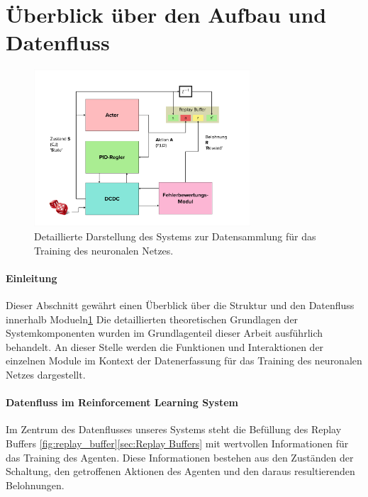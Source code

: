 \section{Überblick über den Aufbau und Datenfluss}

\begin{figure}[htbp]
\centering
\includegraphics[width=0.72\textwidth]{3Experiment/2Experiment/0Experiment_Grob.png}
\caption{Detaillierte Darstellung des Systems zur Datensammlung für das Training des neuronalen Netzes.}
\label{fig:data_collection_system}
\end{figure}


\paragraph{Einleitung}
Dieser Abschnitt gewährt einen Überblick über die Struktur und den Datenfluss innerhalb Modueln\ref{fig:data_collection_system} Die detaillierten theoretischen Grundlagen der Systemkomponenten wurden im Grundlagenteil dieser Arbeit ausführlich behandelt. An dieser Stelle werden die Funktionen und Interaktionen der einzelnen Module im Kontext der Datenerfassung für das Training des neuronalen Netzes dargestellt.


\paragraph{Datenfluss im Reinforcement Learning System}
Im Zentrum des Datenflusses unseres Systems steht die Befüllung des Replay Buffers \ref{fig:replay_buffer}\ref{sec:Replay Buffers} mit wertvollen Informationen für das Training des Agenten. Diese Informationen bestehen aus den Zuständen der Schaltung, den getroffenen Aktionen des Agenten und den daraus resultierenden Belohnungen. 





